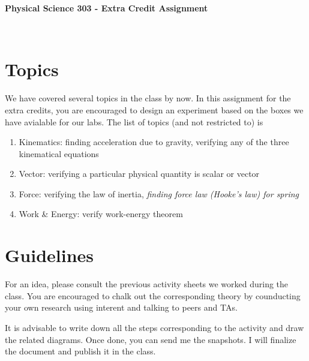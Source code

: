 \documentclass[10pt]{article}
\date{2014-6-22}
\begin{document}
\begin{center}
\begin{Large}\textbf{Physical Science 303 - Extra Credit Assignment}\end{Large} \\
\smallskip
\end{center}
\section{Topics}
We have covered several topics in the class by now.  In this assignment for the extra credits, you are encouraged to design an experiment based on the boxes we have avialable for our labs.  The list of topics (and not restricted to) is
\begin{enumerate}
\item Kinematics: finding acceleration due to gravity, verifying any of the three kinematical equations
\item Vector: verifying a particular physical quantity is scalar or vector
\item Force: verifying the law of inertia, \emph{finding force law (Hooke's law) for spring} 
\item Work \& Energy: verify work-energy theorem  
\end{enumerate}
\section{Guidelines}
For an  idea, please consult the previous activity sheets we worked during the class.  You are encouraged to chalk out the corresponding theory by counducting your own research using interent and talking to peers and TAs.

It is advisable to write down all the steps corresponding to the activity and draw the related diagrams.  Once done, you can send me the snapshots.  I will finalize the document and publish it in the class.
\end{document}
